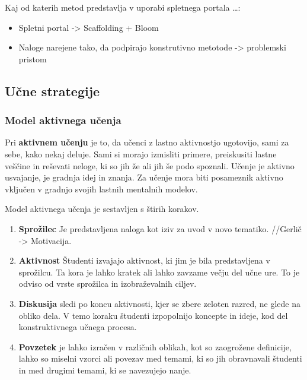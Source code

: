Kaj od katerih metod predstavlja v uporabi spletnega portala \ldots{}:

\begin{itemize}
\item
  Spletni portal -\textgreater{} Scaffolding + Bloom
\item
  Naloge narejene tako, da podpirajo konstrutivno metotode
  -\textgreater{} problemski pristom
\end{itemize}

\subsection{Učne strategije}
\label{sec:učne_strategije}

\subsubsection{Model aktivnega učenja}
\label{sec:model_aktivnega_učenja}

Pri \textbf{aktivnem učenju} je to, da učenci z lastno aktivnostjo
ugotovijo, sami za sebe, kako nekaj deluje. Sami si morajo izmisliti
primere, preiskusiti lastne veščine in reševati neloge, ki so jih že
ali jih še podo spoznali. Učenje je aktivno usvajanje, je gradnja idej
in znanja. Za učenje mora biti posameznik aktivno vključen v gradnjo
svojih lastnih mentalnih modelov.

Model aktivnega učenja je sestavljen s štirih korakov.

\begin{enumerate}
\item \textbf{Sprožilec} Je predstavljena naloga kot iziv za uvod v novo
tematiko.  //Gerlič -> Motivacija.
\item \textbf{Aktivnost} Študenti izvajajo aktivnost, ki jim je bila
predstavljena v sprožilcu. Ta kora je lahko kratek ali lahko
zavzame večju del učne ure. To je odviso od vrste sprožilca in
izobraževalnih ciljev.
\item \textbf{Diskusija} sledi po koncu aktivnosti, kjer se zbere zeloten
razred, ne glede na obliko dela. V temo koraku študenti izpopolnijo
koncepte in ideje, kod del konstruktivnega učnega procesa.
\item \textbf{Povzetek} je lahko izračen v različnih oblikah, kot so
zaogrožene definicije, lahko so miselni vzorci ali povezav med
temami, ki so jih obravnavali študenti in med drugimi temami, ki se
navezujejo nanje.
\end{enumerate}

